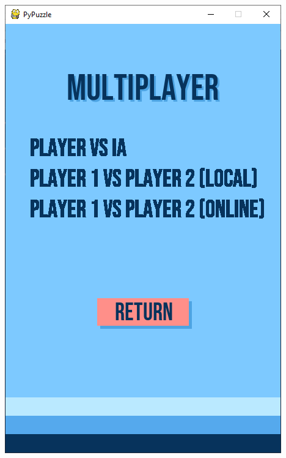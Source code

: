 \documentclass[a4paper]{report}
\begin{document}
\begin{enumerate}
        \includegraphics[scale=0.3]{images/2-menumulti.png}

\end{enumerate}
\end{document}
